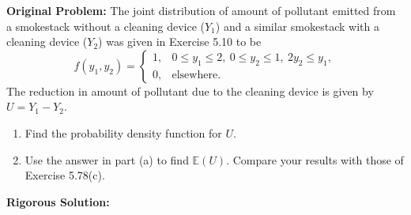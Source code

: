 \documentclass[11pt, letterpaper]{article}
\theoremstyle{definition}
\theoremstyle{remark}
\newcommand{\E}{\mathbb{E}}
\begin{document}
\textbf{Original Problem:}
The joint distribution of amount of pollutant emitted from a smokestack without a cleaning device ($Y_1$) and a similar smokestack with a cleaning device ($Y_2$) was given in Exercise 5.10 to be
\[
    f(y_1, y_2) = \begin{cases} 1, & 0 \le y_1 \le 2, \ 0 \le y_2 \le 1, \ 2y_2 \le y_1, \\ 0, & \text{elsewhere.} \end{cases}
\]
The reduction in amount of pollutant due to the cleaning device is given by $U = Y_1 - Y_2$.
\begin{enumerate}[label=\textbf{\alph*}]
    \item Find the probability density function for $U$.
    \item Use the answer in part (a) to find $\E(U)$. Compare your results with those of Exercise 5.78(c).
\end{enumerate}

\hrulefill

\textbf{Rigorous Solution:}
\end{document}
